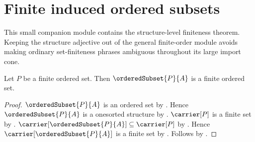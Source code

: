 \section{Finite induced ordered subsets}





This small companion module contains the structure-level finiteness theorem.
Keeping the structure adjective out of the general finite-order module avoids
making ordinary set-finiteness phrases ambiguous throughout its large import
cone.

\begin{theorem}\label{finite_ordered_subset}
    Let $P$ be a finite ordered set.
    Then $\orderedSubset{P}{A}$ is a finite ordered set.
\end{theorem}
\begin{proof}
    $\orderedSubset{P}{A}$ is an ordered set by
        .
    Hence $\orderedSubset{P}{A}$ is a onesorted structure by
        .
    $\carrier[P]$ is a finite set by .
    $\carrier[\orderedSubset{P}{A}]\subseteq\carrier[P]$ by
        .
    Hence $\carrier[\orderedSubset{P}{A}]$ is a finite set by
        .
    Follows by .
\end{proof}

